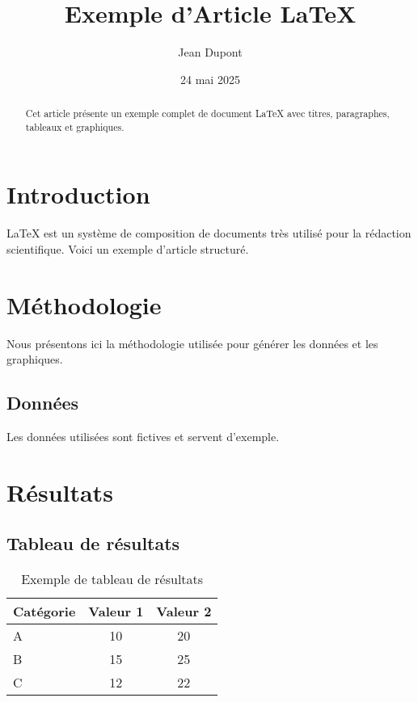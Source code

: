 \documentclass{article}
\title{Exemple d'Article LaTeX}
\author{Jean Dupont}
\date{24 mai 2025}
\begin{document}
\maketitle

\begin{abstract}
Cet article présente un exemple complet de document LaTeX avec titres, paragraphes, tableaux et graphiques.
\end{abstract}

\section{Introduction}

LaTeX est un système de composition de documents très utilisé pour la rédaction scientifique. Voici un exemple d'article structuré.

\section{Méthodologie}

Nous présentons ici la méthodologie utilisée pour générer les données et les graphiques.

\subsection{Données}

Les données utilisées sont fictives et servent d'exemple.

\section{Résultats}

\subsection{Tableau de résultats}

\begin{table}[H]
    \centering
    \caption{Exemple de tableau de résultats}
    \begin{tabular}{lcc}
        \toprule
        Catégorie & Valeur 1 & Valeur 2 \\
        \midrule
        A & 10 & 20 \\
        B & 15 & 25 \\
        C & 12 & 22 \\
        \bottomrule
    \end{tabular}
\end{table}
\end{document}
